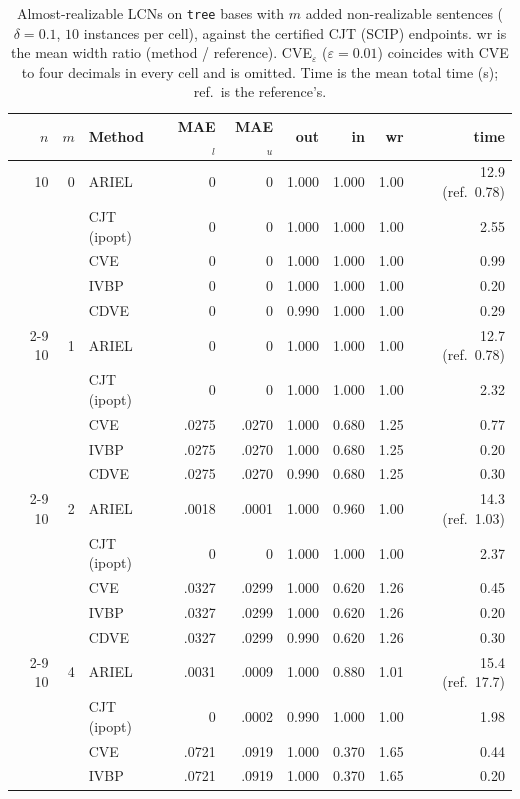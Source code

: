\begin{table}[htbp]
\centering
\scriptsize
\caption{Almost-realizable LCNs on \texttt{tree} bases with $m$ added non-realizable sentences ($\delta=0.1$, $10$ instances per cell), against the certified CJT (SCIP) endpoints. wr is the mean width ratio (method / reference). CVE$_\varepsilon$ ($\varepsilon{=}0.01$) coincides with CVE to four decimals in every cell and is omitted. Time is the mean total time (s); ref.\ is the reference's.}
\label{tab:nr-tree}
\begin{tabular}{rrlrrrrrr}
\toprule
$n$ & $m$ & Method & MAE$_l$ & MAE$_u$ & out & in & wr & time \\
\midrule
10 & 0 & ARIEL & 0 & 0 & 1.000 & 1.000 & 1.00 & 12.9 (ref.\ 0.78) \\
 &  & CJT (ipopt) & 0 & 0 & 1.000 & 1.000 & 1.00 & 2.55 \\
 &  & CVE & 0 & 0 & 1.000 & 1.000 & 1.00 & 0.99 \\
 &  & IVBP & 0 & 0 & 1.000 & 1.000 & 1.00 & 0.20 \\
 &  & CDVE & 0 & 0 & 0.990 & 1.000 & 1.00 & 0.29 \\
\cmidrule(l){2-9}
10 & 1 & ARIEL & 0 & 0 & 1.000 & 1.000 & 1.00 & 12.7 (ref.\ 0.78) \\
 &  & CJT (ipopt) & 0 & 0 & 1.000 & 1.000 & 1.00 & 2.32 \\
 &  & CVE & .0275 & .0270 & 1.000 & 0.680 & 1.25 & 0.77 \\
 &  & IVBP & .0275 & .0270 & 1.000 & 0.680 & 1.25 & 0.20 \\
 &  & CDVE & .0275 & .0270 & 0.990 & 0.680 & 1.25 & 0.30 \\
\cmidrule(l){2-9}
10 & 2 & ARIEL & .0018 & .0001 & 1.000 & 0.960 & 1.00 & 14.3 (ref.\ 1.03) \\
 &  & CJT (ipopt) & 0 & 0 & 1.000 & 1.000 & 1.00 & 2.37 \\
 &  & CVE & .0327 & .0299 & 1.000 & 0.620 & 1.26 & 0.45 \\
 &  & IVBP & .0327 & .0299 & 1.000 & 0.620 & 1.26 & 0.20 \\
 &  & CDVE & .0327 & .0299 & 0.990 & 0.620 & 1.26 & 0.30 \\
\cmidrule(l){2-9}
10 & 4 & ARIEL & .0031 & .0009 & 1.000 & 0.880 & 1.01 & 15.4 (ref.\ 17.7) \\
 &  & CJT (ipopt) & 0 & .0002 & 0.990 & 1.000 & 1.00 & 1.98 \\
 &  & CVE & .0721 & .0919 & 1.000 & 0.370 & 1.65 & 0.44 \\
 &  & IVBP & .0721 & .0919 & 1.000 & 0.370 & 1.65 & 0.20 \\

\end{tabular}
\end{table}
